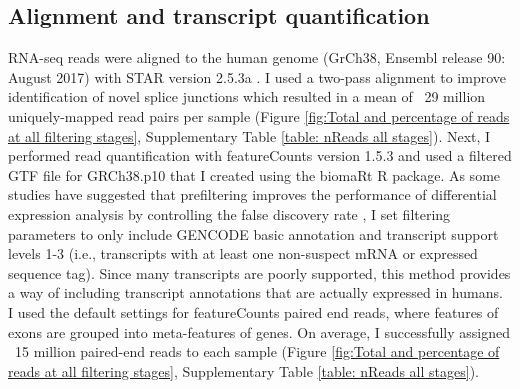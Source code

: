 \documentclass[12pt,a4paper,titlepage,twoside,openright]{book}
\begin{document}
\begin{mainmatter}
{{\section{Alignment and transcript quantification}
RNA-seq reads were aligned to the human genome (GrCh38, Ensembl release 90: August 2017) with STAR version 2.5.3a \cite{dobin2013star}. I used a two-pass alignment to improve identification of novel splice junctions which resulted in a mean of ~29 million uniquely-mapped read pairs per sample (Figure \ref{fig:Total and percentage of reads at all filtering stages}, Supplementary Table \ref{table: nReads all stages}). Next, I performed read quantification with featureCounts version 1.5.3 \cite{liao2013featurecounts} and used a filtered GTF file for GRCh38.p10 that I created using the biomaRt R package. As some studies have suggested that prefiltering improves the performance of differential expression analysis by controlling the false discovery rate \cite{soneson2015differential}, I set filtering parameters to only include GENCODE basic annotation and transcript support levels 1-3 (i.e., transcripts with at least one non-suspect mRNA or expressed sequence tag). Since many transcripts are poorly supported, this method provides a way of including transcript annotations that are actually expressed in humans. I used the default settings for featureCounts paired end reads, where features of exons are grouped into meta-features of genes. On average, I successfully assigned ~15 million paired-end reads to each sample (Figure \ref{fig:Total and percentage of reads at all filtering stages}, Supplementary Table \ref{table: nReads all stages}). 

}}
\end{mainmatter}
\end{document}

